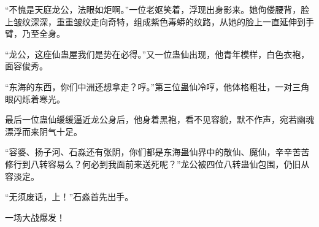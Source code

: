\begin{this_body}
“不愧是天庭龙公，法眼如炬啊。”一位老妪笑着，浮现出身影来。她佝偻腰背，脸上皱纹深深，重重皱纹走向奇特，组成紫色毒蟒的纹路，从她的脸上一直延伸到手臂，乃至全身。

“龙公，这座仙蛊屋我们是势在必得。”又一位蛊仙出现，他青年模样，白色衣袍，面容俊秀。

“东海的东西，你们中洲还想拿走？哼。”第三位蛊仙冷哼，他体格粗壮，一对三角眼闪烁着寒光。

最后一位蛊仙缓缓逼近龙公身后，他身着黑袍，看不见容貌，默不作声，宛若幽魂漂浮而来阴气十足。

“容婆、扬子河、石淼还有张阴，你们都是东海蛊仙界中的散仙、魔仙，辛辛苦苦修行到八转容易么？何必到我面前来送死呢？”龙公被四位八转蛊仙包围，仍旧从容淡定。

“无须废话，上！”石淼首先出手。

一场大战爆发！

\end{this_body}

